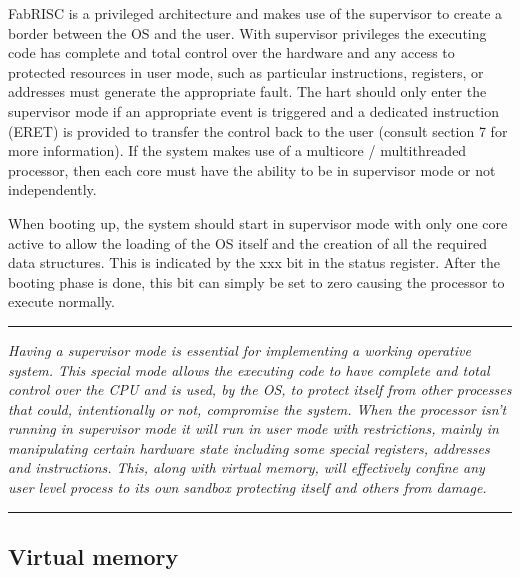 \documentclass{article}
\begin{document}
            \vspace{10pt}

            FabRISC is a privileged architecture and makes use of the supervisor to create a border between the OS and the user. With supervisor privileges the executing code has complete and total control over the hardware and any access to protected resources in user mode, such as particular instructions, registers, or addresses must generate the appropriate fault. The hart should only enter the supervisor mode if an appropriate event is triggered and a dedicated instruction (ERET) is provided to transfer the control back to the user (consult section 7 for more information). If the system makes use of a multicore / multithreaded processor, then each core must have the ability to be in supervisor mode or not independently.

            \vspace{10pt}

            When booting up, the system should start in supervisor mode with only one core active to allow the loading of the OS itself and the creation of all the required data structures. This is indicated by the xxx bit in the status register. After the booting phase is done, this bit can simply be set to zero causing the processor to execute normally.

        \par\noindent\rule{\textwidth}{0.4pt}
        \textit{Having a supervisor mode is essential for implementing a working operative system. This special mode allows the executing code to have complete and total control over the CPU and is used, by the OS, to protect itself from other processes that could, intentionally or not, compromise the system. When the processor isn't running in supervisor mode it will run in user mode with restrictions, mainly in manipulating certain hardware state including some special registers, addresses and instructions. This, along with virtual memory, will effectively confine any user level process to its own sandbox protecting itself and others from damage.}
        \par\noindent\rule{\textwidth}{0.4pt}

        \subsection{Virtual memory}

            \vspace{10pt}
\end{document}
